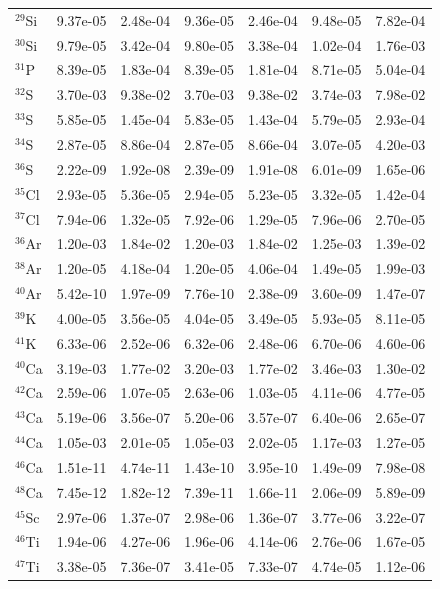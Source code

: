 \begin{table}
\begin{tabular}{l|cc|cc|cc}
$^{29}$Si & 9.37e-05 & 2.48e-04 & 9.36e-05 & 2.46e-04 & 9.48e-05 & 7.82e-04\\
$^{30}$Si & 9.79e-05 & 3.42e-04 & 9.80e-05 & 3.38e-04 & 1.02e-04 & 1.76e-03\\
$^{31}$P & 8.39e-05 & 1.83e-04 & 8.39e-05 & 1.81e-04 & 8.71e-05 & 5.04e-04\\
$^{32}$S & 3.70e-03 & 9.38e-02 & 3.70e-03 & 9.38e-02 & 3.74e-03 & 7.98e-02\\
$^{33}$S & 5.85e-05 & 1.45e-04 & 5.83e-05 & 1.43e-04 & 5.79e-05 & 2.93e-04\\
$^{34}$S & 2.87e-05 & 8.86e-04 & 2.87e-05 & 8.66e-04 & 3.07e-05 & 4.20e-03\\
$^{36}$S & 2.22e-09 & 1.92e-08 & 2.39e-09 & 1.91e-08 & 6.01e-09 & 1.65e-06\\
$^{35}$Cl & 2.93e-05 & 5.36e-05 & 2.94e-05 & 5.23e-05 & 3.32e-05 & 1.42e-04\\
$^{37}$Cl & 7.94e-06 & 1.32e-05 & 7.92e-06 & 1.29e-05 & 7.96e-06 & 2.70e-05\\
$^{36}$Ar & 1.20e-03 & 1.84e-02 & 1.20e-03 & 1.84e-02 & 1.25e-03 & 1.39e-02\\
$^{38}$Ar & 1.20e-05 & 4.18e-04 & 1.20e-05 & 4.06e-04 & 1.49e-05 & 1.99e-03\\
$^{40}$Ar & 5.42e-10 & 1.97e-09 & 7.76e-10 & 2.38e-09 & 3.60e-09 & 1.47e-07\\
$^{39}$K & 4.00e-05 & 3.56e-05 & 4.04e-05 & 3.49e-05 & 5.93e-05 & 8.11e-05\\
$^{41}$K & 6.33e-06 & 2.52e-06 & 6.32e-06 & 2.48e-06 & 6.70e-06 & 4.60e-06\\
$^{40}$Ca & 3.19e-03 & 1.77e-02 & 3.20e-03 & 1.77e-02 & 3.46e-03 & 1.30e-02\\
$^{42}$Ca & 2.59e-06 & 1.07e-05 & 2.63e-06 & 1.03e-05 & 4.11e-06 & 4.77e-05\\
$^{43}$Ca & 5.19e-06 & 3.56e-07 & 5.20e-06 & 3.57e-07 & 6.40e-06 & 2.65e-07\\
$^{44}$Ca & 1.05e-03 & 2.01e-05 & 1.05e-03 & 2.02e-05 & 1.17e-03 & 1.27e-05\\
$^{46}$Ca & 1.51e-11 & 4.74e-11 & 1.43e-10 & 3.95e-10 & 1.49e-09 & 7.98e-08\\
$^{48}$Ca & 7.45e-12 & 1.82e-12 & 7.39e-11 & 1.66e-11 & 2.06e-09 & 5.89e-09\\
$^{45}$Sc & 2.97e-06 & 1.37e-07 & 2.98e-06 & 1.36e-07 & 3.77e-06 & 3.22e-07\\
$^{46}$Ti & 1.94e-06 & 4.27e-06 & 1.96e-06 & 4.14e-06 & 2.76e-06 & 1.67e-05\\
$^{47}$Ti & 3.38e-05 & 7.36e-07 & 3.41e-05 & 7.33e-07 & 4.74e-05 & 1.12e-06\\

\end{tabular}
\end{table}
